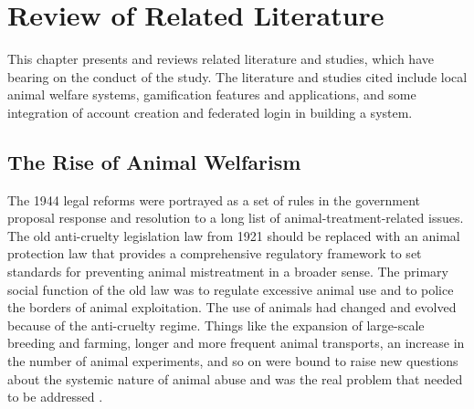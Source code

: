 \chapter{Review of Related Literature}
\label{sec:relatedlit}
This chapter presents and reviews related literature and studies, which have bearing on the conduct of the study. The literature and studies cited include local animal welfare systems, gamification features and applications, and some integration of account creation and federated login in building a system. 

\begin{comment}
%
%
Guide on Writing your RRL chapter
 
1. Identify the keywords with respect to your research
      One keyword = One document section
                Examples: 2.1 Story Generation Systems
			 2.2 Knowledge Representation

2.  Find references using these keywords

3.  For each of the references that you find,
        Check: Is it relevant to your research?
        Use their references to find more relevant works.

4. Identify a set of criteria for comparison.
       It will serve as a guide to help you focus on what to look for

5. Write a summary focusing on -
       What: A short description of the work
       How: A summary of the approach it utilized
       Findings: If applicable, provide the results
        Why: Relevance to your work

6. At the end of each section,  show a Table of Comparison of the related works 
   and your proposed project/system

\end{comment}

%
%

\section{The Rise of Animal Welfarism}

The 1944 legal reforms were portrayed as a set of rules in the government
proposal response and resolution to a long list of animal-treatment-related issues.
The old anti-cruelty legislation law from 1921 should be replaced with an animal
protection law that provides a comprehensive regulatory framework to set standards
for preventing animal mistreatment in a broader sense. The primary social
function of the old law was to regulate excessive animal use and to police the
borders of animal exploitation. The use of animals had changed and evolved because
of the anti-cruelty regime. Things like the expansion of large-scale breeding
and farming, longer and more frequent animal transports, an increase in the number
of animal experiments, and so on were bound to raise new questions about
the systemic nature of animal abuse and was the real problem that needed to be
addressed \cite{svard2015problem}.

